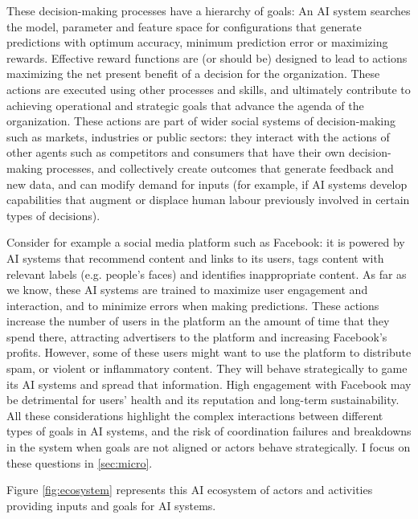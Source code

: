 \documentclass[11pt]{article}
\begin{document}
These decision-making processes have a hierarchy of goals: An AI system searches the model, parameter and feature space for configurations that generate predictions with optimum accuracy, minimum prediction error or maximizing rewards. Effective reward functions are (or should be) designed to lead to actions maximizing the net present benefit of a decision for the organization. These actions are executed using other processes and skills, and ultimately contribute to achieving operational and strategic goals that advance the agenda of the organization. These actions are part of wider social systems of decision-making such as markets, industries or public sectors: they interact with the actions of other agents such as competitors and consumers that have their own decision-making processes, and collectively create outcomes that generate feedback and new data, and can modify demand for inputs (for example, if AI systems develop capabilities that augment or displace human labour previously involved in certain types of decisions). 

Consider for example a social media platform such as Facebook: it is powered by AI systems that recommend content and links to its users, tags content with relevant labels (e.g. people's faces) and identifies inappropriate content. As far as we know, these AI systems are trained to maximize user engagement and interaction, and to minimize errors when making predictions. These actions increase the number of users in the platform an the amount of time that they spend there, attracting advertisers to the platform and increasing Facebook's profits. However, some of these users might want to use the platform to distribute spam, or violent or inflammatory content. They will behave strategically to game its AI systems and spread that information. High engagement with Facebook may be detrimental for users' health and its reputation and long-term sustainability. All these considerations highlight the complex interactions between different types of goals in AI systems, and the risk of coordination failures and breakdowns in the system when goals are not aligned or actors behave strategically. I focus on these questions in \ref{sec:micro}.

Figure \ref{fig:ecosystem} represents this AI ecosystem of actors and activities providing inputs and goals for AI systems.
\end{document}
